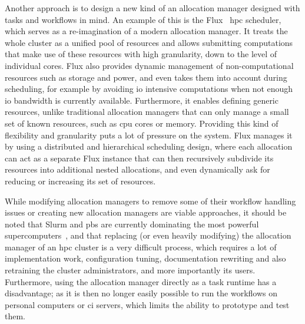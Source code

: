 Another approach is to design a new kind of an allocation manager designed with tasks and workflows
in mind. An example of this is the Flux~\cite{flux} \gls{hpc} scheduler,
which serves as a re-imagination of a modern allocation manager. It treats the whole cluster as a
unified pool of resources and allows submitting computations that make use of these resources with
high granularity, down to the level of individual cores. Flux also provides dynamic management of
non-computational resources such as storage and power, and even takes them into account during
scheduling, for example by avoiding \gls{io} intensive computations when not enough
\gls{io} bandwidth is currently available. Furthermore, it enables defining generic
resources, unlike traditional allocation managers that can only manage a small set of known
resources, such as \gls{cpu} cores or memory. Providing this kind of flexibility and
granularity puts a lot of pressure on the system. Flux manages it by using a distributed and
hierarchical scheduling design, where each allocation can act as a separate Flux instance that can
then recursively subdivide its resources into additional nested allocations, and even dynamically
ask for reducing or increasing its set of resources.

While modifying allocation managers to remove some of their workflow handling issues or creating
new allocation managers are viable approaches, it should be noted that Slurm and
\gls{pbs} are currently dominating the most powerful
supercomputers~\cite{slurm-schedmd}, and that replacing (or even heavily modifying) the
allocation manager of an \gls{hpc} cluster is a very difficult process, which
requires a lot of implementation work, configuration tuning, documentation rewriting and also
retraining the cluster administrators, and more importantly its users. Furthermore, using the
allocation manager directly as a task runtime has a disadvantage; as it is then no longer easily
possible to run the workflows on personal computers or \gls{ci} servers, which
limits the ability to prototype and test them.

